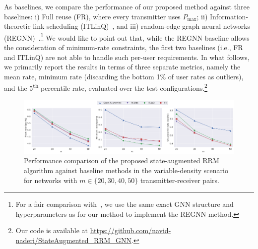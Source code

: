 \documentclass[lettersize,journal]{IEEEtran}
\begin{document}
As baselines, we compare the performance of our proposed method against three baselines: i) Full reuse (FR), where every transmitter uses $P_{\max}$; ii) Information-theoretic link scheduling (ITLinQ)~\cite{naderializadeh2014itlinq}, and iii) random-edge graph neural networks (REGNN)~\cite{eisen2020optimal}.\footnote{For a fair comparison with~\cite{eisen2020optimal}, we use the same exact GNN structure and hyperparameters as for our method to implement the REGNN method.} We would like to point out that, while the REGNN baseline allows the consideration of minimum-rate constraints, the first two baselines (i.e., FR and ITLinQ) are not able to handle such per-user requirements. In what follows, we primarily report the results in terms of three separate metrics, namely the mean rate, minimum rate (discarding the bottom 1\% of user rates as outliers), and the 5\textsuperscript{th} percentile rate, evaluated over the test configurations.\footnote{Our code is available at \url{https://github.com/navid-naderi/StateAugmented_RRM_GNN}.}




\begin{figure}[h]
\centering
\includegraphics[width=\textwidth]{fig_scalability_variable_density.pdf}
\caption{Performance comparison of the proposed state-augmented RRM algorithm against baseline methods in the variable-density scenario for networks with $m\in\{20, 30, 40, 50\}$ transmitter-receiver pairs.}
\label{fig:scalability_variable_density}
\end{figure}
\end{document}
